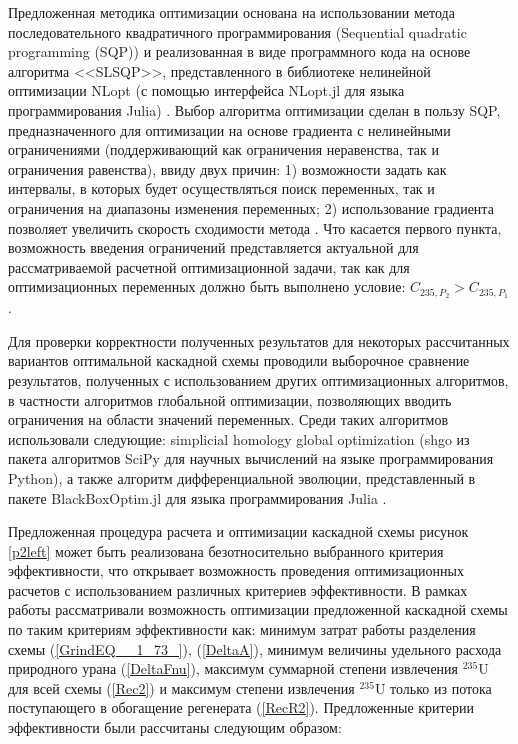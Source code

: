 Предложенная методика оптимизации основана на использовании метода последовательного квадратичного программирования (Sequential quadratic programming (SQP)) и реализованная в виде программного кода на основе алгоритма <<SLSQP>>, представленного в библиотеке нелинейной оптимизации NLopt (с помощью интерфейса NLopt.jl для языка программирования Julia) \cite{NLopt}. Выбор алгоритма оптимизации сделан в пользу SQP, предназначенного для оптимизации на основе градиента с нелинейными ограничениями (поддерживающий как ограничения неравенства, так и ограничения равенства), ввиду двух причин: 1) возможности задать как интервалы, в которых будет осуществляться поиск переменных, так и ограничения на диапазоны изменения переменных; 2) использование градиента позволяет увеличить скорость сходимости метода \cite{NumericalOptimization2006}. Что касается первого пункта, возможность введения ограничений представляется актуальной для рассматриваемой расчетной оптимизационной задачи, так как для оптимизационных переменных должно быть выполнено условие: ${C_{235,{P_2}}}>{C_{235,{P_1}}}$. 

Для проверки корректности полученных результатов для некоторых рассчитанных вариантов оптимальной каскадной схемы проводили выборочное сравнение результатов, полученных с использованием других оптимизационных алгоритмов, в частности алгоритмов глобальной оптимизации, позволяющих вводить ограничения на области значений переменных. Среди таких алгоритмов использовали следующие: simplicial homology global optimization (shgo из пакета алгоритмов SciPy для научных вычислений на языке программирования Python), а также алгоритм дифференциальной эволюции, представленный в пакете BlackBoxOptim.jl для языка программирования Julia \cite{пантелеевМетаэвристическиеАлгоритмыПоиска2009,virtanenSciPyFundamentalAlgorithms2020,endresSimplicialHomologyAlgorithm2018,mogensenOptimMathematicalOptimization2018,storn1997differential,Price-et-al-differential-evolution-2005,Feldt2018}.

Предложенная процедура расчета и оптимизации каскадной схемы рисунок \ref{p2left} может быть реализована безотносительно выбранного критерия эффективности, что открывает возможность проведения оптимизационных расчетов с использованием различных критериев эффективности. В рамках работы рассматривали возможность оптимизации предложенной каскадной схемы по таким критериям эффективности как: минимум затрат работы разделения схемы (\ref{GrindEQ__1_73_}), (\ref{DeltaA}), минимум величины удельного расхода природного урана (\ref{DeltaFnu}), максимум суммарной степени извлечения $^{235}$U для всей схемы (\ref{Rec2}) и максимум степени извлечения $^{235}$U только из потока поступающего в обогащение регенерата (\ref{RecR2}). Предложенные критерии эффективности были рассчитаны следующим образом:

